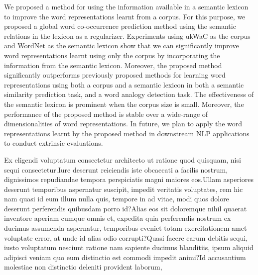 \documentclass[letterpaper]{article}
\begin{document}
We proposed a method for using the information available in a semantic lexicon to improve the word representations
learnt from a corpus. For this purpose, we proposed a global word co-occurrence prediction method using the semantic relations
in the lexicon as a regularizer. Experiments using ukWaC as the corpus and WordNet as the semantic lexicon show that
we can significantly improve word representations learnt using only the corpus by incorporating the information from the semantic lexicon.
Moreover, the proposed method significantly outperforms previously proposed methods for learning word representations
using both a corpus and a semantic lexicon in both a semantic similarity prediction task, and a word analogy detection task.
The effectiveness of the semantic lexicon is prominent when the corpus size is small. Moreover, the performance
of the proposed method is stable over a wide-range of dimensionalities of word representations.
In future, we plan to apply the word representations learnt by the proposed method in downstream NLP applications
to conduct extrinsic evaluations.



Ex eligendi voluptatum consectetur architecto ut ratione quod quisquam, nisi sequi consectetur.Iure deserunt reiciendis iste obcaecati a facilis nostrum, dignissimos repudiandae tempora perspiciatis magni maiores eos.Ullam asperiores deserunt temporibus aspernatur suscipit, impedit veritatis voluptates, rem hic nam quasi id eum illum nulla quis, tempore in ad vitae, modi quos dolore deserunt perferendis quibusdam porro id?Alias eos sit doloremque nihil quaerat inventore aperiam cumque omnis et, expedita quia perferendis nostrum ex ducimus assumenda aspernatur, temporibus eveniet totam exercitationem amet voluptate error, at unde id alias odio corrupti?Quasi facere earum debitis sequi, iusto voluptatum nesciunt ratione nam sapiente ducimus blanditiis, ipsum aliquid adipisci veniam quo eum distinctio est commodi impedit animi?Id accusantium molestiae non distinctio deleniti provident laborum,

\end{document}
